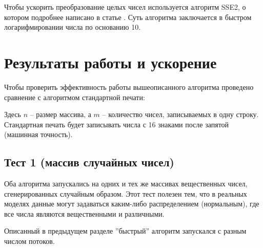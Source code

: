 \documentclass[specialist,subf,href,colorlinks=true,14pt
,times,mtpro,specialist
]{disser}
\begin{document}
Чтобы ускорить преобразование целых чисел используется алгоритм \textsf{SSE2}, о котором подробнее написано в статье \cite{2}.
Суть алгоритма заключается в быстром логарифмировании числа по основанию 10.

\section{Результаты работы и ускорение}
Чтобы проверить эффективность работы вышеописанного алгоритма проведено сравнение с алгоритмом стандартной печати: \vspace{12pt}
Здесь $n$ -- размер массива, а $m$ -- количество чисел, записываемых в одну строку.
Стандартная печать будет записывать числа с 16 знаками после запятой (машинная точность).

\subsection{Тест 1 (массив случайных чисел)} \label{t1}
Оба алгоритма запускались на одних и тех же массивах вещественных чисел, сгенерированных случайным образом. 
Этот тест полезен тем, что в реальных моделях данные могут задаваться каким-либо распределением (нормальным), где все числа являются вещественными и различными.

Описанный в предыдущем разделе ''быстрый'' алгоритм запускался с разным числом потоков.
\end{document}
